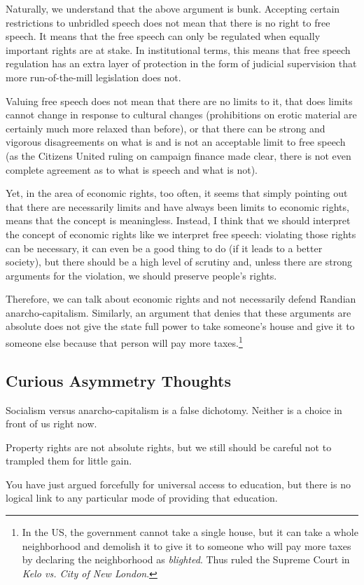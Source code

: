 Naturally, we understand that the above argument is bunk. Accepting certain
restrictions to unbridled speech does not mean that there is no right to free
speech. It means that the free speech can only be regulated when equally
important rights are at stake. In institutional terms, this means that free
speech regulation has an extra layer of protection in the form of judicial
supervision that more run-of-the-mill legislation does not.

Valuing free speech does not mean that there are no limits to it, that does
limits cannot change in response to cultural changes (prohibitions on erotic
material are certainly much more relaxed than before), or that there can be
strong and vigorous disagreements on what is and is not an acceptable limit to
free speech (as the Citizens United ruling on campaign finance made clear,
there is not even complete agreement as to what is speech and what is not).

Yet, in the area of economic rights, too often, it seems that simply pointing
out that there are necessarily limits and have always been limits to economic
rights, means that the concept is meaningless. Instead, I think that we should
interpret the concept of economic rights like we interpret free speech:
violating those rights can be necessary, it can even be a good thing to do (if
it leads to a better society), but there should be a high level of scrutiny
and, unless there are strong arguments for the violation, we should preserve
people's rights.

Therefore, we can talk about economic rights and not necessarily defend Randian
anarcho-capitalism. Similarly, an argument that denies that these arguments are
absolute does not give the state full power to take someone's house and give it
to someone else because that person will pay more taxes.\footnote{In the US,
the government cannot take a single house, but it can take a whole neighborhood
and demolish it to give it to someone who will pay more taxes by declaring the
neighborhood as \emph{blighted}. Thus ruled the Supreme Court in \emph{Kelo vs.
City of New London}.}

\subsection{Curious Asymmetry Thoughts}

\thought Socialism versus anarcho-capitalism is a false dichotomy. Neither is a
choice in front of us right now.

\thought Property rights are not absolute rights, but we still should be
careful not to trampled them for little gain.

\thought You have just argued forcefully for universal access to education, but
there is no logical link to any particular mode of providing that education.

